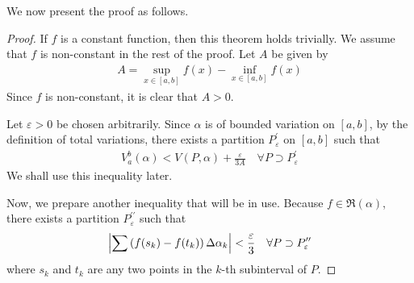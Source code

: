 \documentclass[thmcnt=section, 12pt]{my-elegantbook}
\begin{document}
We now present the proof as follows.

\begin{proof}
    If $f$ is a constant function, then this theorem holds trivially. We assume that $f$ is non-constant in the rest of the proof. Let $A$ be given by 
    \begin{align*}
        A = \sup_{x \in [a, b]} f(x) - \inf_{x \in [a, b]} f(x)
    \end{align*}
    Since $f$ is non-constant, it is clear that $A > 0$.
    
    Let $\varepsilon > 0$ be chosen arbitrarily. Since $\alpha$ is of bounded variation on $[a, b]$, by the definition of total variations, there exists a partition $P^\prime_\varepsilon$ on $[a, b]$ such that 
    \begin{align}
        V_a^b(\alpha) 
        < V(P, \alpha)
        + \frac{\varepsilon}{3A}
        \quad \forall P \supset P^\prime_\varepsilon
        \label{eq:85}
    \end{align}
    We shall use this inequality later.

    \par Now, we prepare another inequality that will be in use. Because $f \in \mathfrak{R}(\alpha)$, there exists a partition $P^{\prime\prime}_\varepsilon$ such that
    \begin{align}
        \left\lvert 
            \sum \left(f(s_k) - f(t_k)\right) 
            \Delta \alpha_k
         \right\rvert < \frac{\varepsilon}{3}
        \quad \forall P \supset P^{\prime\prime}_\varepsilon
        \label{eq:86}
    \end{align}
    where $s_k$ and $t_k$ are any two points in the $k$-th subinterval of $P$.


\end{proof}
\end{document}
